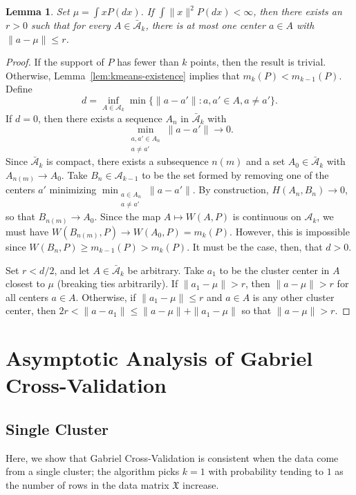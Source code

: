 \documentclass[11pt]{article}
\newtheorem{lemma}{Lemma}
\newcommand{\sA}{\mathcal{A}}
\newcommand{\sbA}{\mathcal{\bar A}}
\newcommand{\dataX}{\mathfrak{X}}
\begin{document}
\begin{lemma}\label{lem:kmeans-separation}
Set $\mu = \int x P(dx)$.  If $\int \|x\|^2 P(dx) < \infty$, then there exists
an $r > 0$ such that for every $A \in \sbA_k$, there is at most one center $a
\in A$ with $\|a - \mu\| \leq r$.
\end{lemma}
\begin{proof}
If the support of $P$ has fewer than $k$ points, then the result is trivial.
Otherwise, Lemma~\ref{lem:kmeans-existence} implies that $m_k(P) <
m_{k-1}(P)$.  Define
\[
  d =
    \inf_{A \in \sA_k}
      \min \{ \|a - a'\| : a,a' \in A, a \neq a' \}.
\]
If $d = 0$, then there exists a sequence $A_n$ in $\sbA_k$ with
\[
  \min_{\substack{a,a' \in A_n \\ a \neq a'}} \|a - a'\| \to 0.
\]
Since $\sbA_k$ is compact, there exists a subsequence $n(m)$ and a set $A_0
\in \sbA_k$ with $A_{n(m)} \to A_0$.  Take $B_n \in \sA_{k-1}$ to be the set
formed by removing one of the centers $a'$ minimizing $\min_{\substack{a \in
A_n \\ a \neq a'}} \|a - a'\|$.  By construction, $H(A_n, B_n) \to 0$, so that
$B_{n(m)} \to A_0$.  Since the map $A \mapsto W(A, P)$ is continuous on
$\sA_k$, we must have $W(B_{n(m)}, P) \to W(A_0, P) = m_k(P)$.  However, this
is impossible since $W(B_n,P) \geq m_{k-1}(P) > m_k(P)$.  It must be the case,
then, that $d > 0$.


Set $r < d/2$, and let $A \in \sbA_k$ be arbitrary.  Take $a_1$ to be the
cluster center in $A$ closest to $\mu$ (breaking ties arbitrarily).  If $\|a_1
- \mu\| > r$, then $\|a - \mu\| > r$ for all centers $a \in A$.  Otherwise, if
$\|a_1 - \mu\| \leq r$ and $a \in A$ is any other cluster center, then
\(
  2r < \|a - a_1\| \leq \|a - \mu\| + \|a_1 - \mu\|
\)
so that
\(
  \|a - \mu\| > r.
\)
\end{proof}



\section{Asymptotic Analysis of Gabriel Cross-Validation}

\subsection{Single Cluster}

Here, we show that Gabriel Cross-Validation is consistent when the data come
from a single cluster; the algorithm picks $k = 1$ with probability tending to
$1$ as the number of rows in the data matrix $\dataX$ increase.
\end{document}
